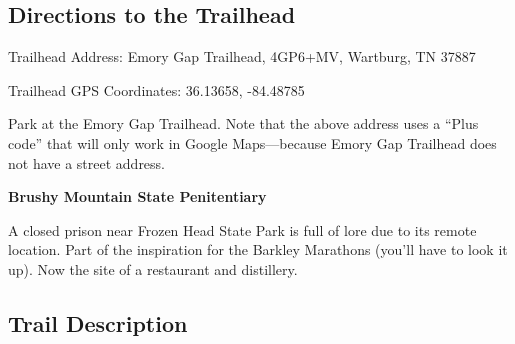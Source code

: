 \documentclass[
  letterpaper,
  DIV=11,
  numbers=noendperiod]{scrreprt}
\begin{document}
\subsection{Directions to the
Trailhead}\label{directions-to-the-trailhead-12}

Trailhead Address: Emory Gap Trailhead, 4GP6+MV, Wartburg, TN 37887

Trailhead GPS Coordinates: 36.13658, -84.48785

Park at the Emory Gap Trailhead. Note that the above address uses a
``Plus code'' that will only work in Google Maps---because Emory Gap
Trailhead does not have a street address.

\begin{tcolorbox}[enhanced jigsaw, opacityback=0, bottomrule=.15mm, colframe=quarto-callout-note-color-frame, breakable, arc=.35mm, leftrule=.75mm, rightrule=.15mm, toprule=.15mm, left=2mm, colback=white]
\begin{minipage}[t]{5.5mm}
\textcolor{quarto-callout-note-color}{\faInfo}
\end{minipage}%
\begin{minipage}[t]{\textwidth - 5.5mm}

\vspace{-3mm}\textbf{Brushy Mountain State Penitentiary}\vspace{3mm}

A closed prison near Frozen Head State Park is full of lore due to its
remote location. Part of the inspiration for the Barkley Marathons
(you'll have to look it up). Now the site of a restaurant and
distillery.

\end{minipage}%
\end{tcolorbox}

\subsection{Trail Description}\label{trail-description-12}
\end{document}
